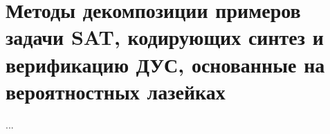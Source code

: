 \chapter{Методы декомпозиции примеров задачи SAT, кодирующих синтез и верификацию ДУС, основанные на вероятностных лазейках}
\label{ch:backdoors}

...
